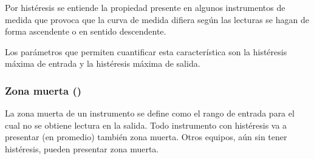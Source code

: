 Por histéresis se entiende la propiedad presente en algunos instrumentos de medida que provoca que la curva de medida difiera según las lecturas se hagan de forma ascendente o en sentido descendente. 

Los parámetros que permiten cuantificar esta característica son la histéresis máxima de entrada y la histéresis máxima de salida.

\subsubsection{Zona muerta ()}

La zona muerta de un instrumento se define como el rango de entrada para el cual no se obtiene lectura en la salida. Todo instrumento con histéresis va a presentar (en promedio) también zona muerta. Otros equipos, aún sin tener histéresis, pueden presentar zona muerta.

